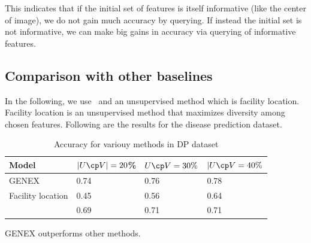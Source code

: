 \documentclass[letterpaper]{article}
\begin{document}
This indicates that if the initial set of features is itself informative (like the center of image), we do not gain much accuracy by querying. If instead the initial set is not informative, we can make big gains in accuracy via querying of informative features.  

\newpage
\subsection{Comparison with other baselines}

In the following, we use~\citet{xiao2022group} and an unsupervised method which is facility location. Facility location is an unsupervised method that maximizes diversity among chosen features. Following are the results for the disease prediction dataset.

\begin{table}[h]
    \centering
    \begin{tabular}{l|l|l|l}
    \hline
Model&	$|U\cp V| = 20$\% &	$U\cp V=30\%$ & 	$|U\cp V=40\%$ \\ \hline
GENEX&	0.74	&0.76	&0.78 \\ \hline
Facility location	&0.45&	0.56&	0.64  \\ \hline
\citet{xiao2022group} &	0.69&	0.71&	0.71 \\ \hline
\end{tabular}
    \caption{Accuracy for variouy methods in DP dataset}
\end{table}
GENEX outperforms other methods.



% 
% 
\end{document}
